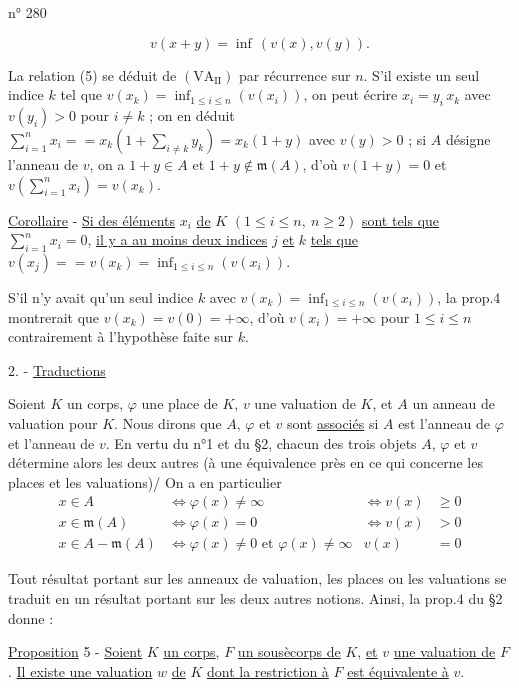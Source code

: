 

n° 280

\[
v(x+y)=\inf\,(v(x),v(y)).
\]

La relation (5) se déduit de $(\mathrm{VA}_{\mathrm{II}})$ par récurrence sur $n$. S'il existe un seul indice $k$ tel que $v(x_k)=\inf_{1\leqslant i\leqslant n}(v(x_i))$, on peut écrire $x_i=y_i\,x_k$ avec $v(y_i)>0$ pour $i\ne k$ ; on en déduit $\sum_{i=1}^n x_i={}
=x_k(1+\sum_{i\ne k}y_k)=x_k(1+y)$ avec $v(y)>0$ ; si $A$ désigne l'anneau de $v$, on a $1+y\in A$ et $1+y\notin\mathfrak{m}(A)$, d'où $v(1+y)=0$ et $v(\sum_{i=1}^n x_i)=v(x_k)$.

\uline{Corollaire} - \uline{Si des éléments} $x_i$ \uline{de} $K$ $(1\leqslant i\leqslant n,\ n\geqslant 2)$ \uline{sont tels que} $\sum_{i=1}^n x_i=0$, \uline{il y a au moins deux indices} $j$ \uline{et} $k$ \uline{tels que} $v(x_j)={}
=v(x_k)=\inf_{1\leqslant i\leqslant n}(v(x_i))$.

S'il n'y avait qu'un seul indice $k$ avec $v(x_k)=\inf_{1\leqslant i\leqslant n}(v(x_i))$, la prop.4 montrerait que $v(x_k)=v(0)=+\infty$, d'où $v(x_i)=+\infty$ pour $1\leqslant i\leqslant n$ contrairement à l'hypothèse faite sur $k$.

2. - \uline{Traductions}

Soient $K$ un corps, $\varphi$ une place de $K$, $v$ une valuation de $K$, et $A$ un anneau de valuation pour $K$. Nous dirons que $A$, $\varphi$ et $v$ sont \uline{associés} si $A$ est l'anneau de $\varphi$ et l'anneau de $v$. En vertu du n°1 et du \S2, chacun des trois objets $A$, $\varphi$ et $v$ détermine alors les deux autres (à une équivalence près en ce qui concerne les places et les valuations)/ On a en particulier
\[
\begin{aligned}
x\in A &\Longleftrightarrow \varphi(x)\ne\infty &\Longleftrightarrow v(x)&\geqslant 0\\
x\in\mathfrak{m}(A) &\Longleftrightarrow \varphi(x)=0 &\Longleftrightarrow v(x)&>0\\
x\in A-\mathfrak{m}(A)&\Longleftrightarrow\varphi(x)\ne0\text{ et }\varphi(x)\ne\infty & v(x)&=0
\end{aligned}
\]

Tout résultat portant sur les anneaux de valuation, les places ou les valuations se traduit en un résultat portant sur les deux autres notions. Ainsi, la prop.4 du \S2 donne :

\uline{Proposition} 5 - \uline{Soient} $K$ \uline{un corps}, $F$ \uline{un sousècorps de} $K$, \uline{et} $v$ \uline{une valuation de} $F$. \uline{Il existe une valuation} $w$ \uline{de} $K$ \uline{dont la restriction à} $F$ \uline{est équivalente à} $v$.

